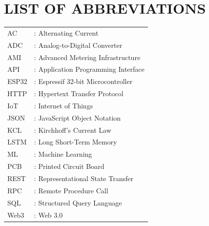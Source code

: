 \newpage
\chapter*{LIST OF ABBREVIATIONS}
\begin{tabular}{l l}
AC & : Alternating Current \\
ADC & : Analog-to-Digital Converter \\
AMI & : Advanced Metering Infrastructure \\
API & : Application Programming Interface \\
ESP32 & : Espressif 32-bit Microcontroller \\
HTTP & : Hypertext Transfer Protocol \\
IoT & : Internet of Things \\
JSON & : JavaScript Object Notation \\
KCL & : Kirchhoff's Current Law \\
LSTM & : Long Short-Term Memory \\
ML & : Machine Learning \\
PCB & : Printed Circuit Board \\
REST & : Representational State Transfer \\
RPC & : Remote Procedure Call \\
SQL & : Structured Query Language \\
Web3 & : Web 3.0 \\


\end{tabular}









